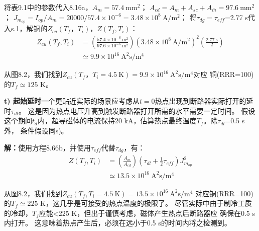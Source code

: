 将表9.1中的参数代入8.16a，$A_m=57.4\ \mathrm{mm^2}$；
$A_{cd}=A_m+A_{sc}+A_{\bar{m}}=97.6\ \mathrm{ mm^2}$；
$J_{m_{op}}=I_{op}/A_m=20000/57.4\times 10^{-6}=3.48\times 10^8\ \mathrm{ A/m^2}$；
将$\tau_{dg}=\tau_{eff}$=2.77 s代入s.1，解铜的$Z_{cu}(T_f，T_i)$，$Z(T_f,T_i)$：
\begin{align*}%
Z_{cu}(T_f,T_i)&=(\frac{57.4\times 10^{-6}\ \mathrm{m^2}}{97.6\times 10^{-6}\ \mathrm{m^2}})(3.48\times 10^8\ \mathrm{A/m^2})^2(\frac{2.77\ \mathrm{s}}{2})\\
&\simeq 9.9\times 10^{16}\ \mathrm{A^2s/m^4}
\end{align*}

从图8.2，我们找到$Z_{cu}(T_f，T_i=4.5\ \mathrm{K})=9.9\times 10^{16}\ \mathrm{A^2 s/m^4}$对应
铜(RRR=100)的$T_f\simeq 125$ K。

\textbf{t) 起始延时}\qquad 一个更贴近实际的场景应考虑从$t=0$热点出现到断路器实际打开的延时$\tau_{dl}$。
这是因为热点电压升高到触发断路器打开所需的水平需要一定时间。
假设这个期间$t_d$内，超导磁体的电流保持20 kA，估算热点最终温度$T_f$。除$\tau_{dl}$=0.5 s外，
条件假设同s)。

\textbf{解：}使用方程8.66b，并使用$\tau_{eff}$代替$\tau_{dg}$，有：
\begin{align*}%
Z(T_f,T_i)&=(\frac{A_m}{A_{cd}})(\tau_{dl}+\frac{1}{2}\tau_{eff})J_{m_{op}}^2\\
&\simeq 13.5\times 10^{16}\ \mathrm{A^2s/m^4}
\end{align*}

从图8.2，我们找到$Z_{cu}(T_f,T_i=4.5\ \mathrm{K})=13.5\times 10^{16}\ \mathrm{A^2 s/m^4}$
对应铜(RRR=100)的$T_f\simeq 225$ K，这几乎是可接受的热点温度的极限了。
尽管实际中由于制冷工质的冷却，$T_f$应能<225 K，但出于谨慎考虑，磁体产生热点后断路器应
确保在0.5 s内打开。
这意味着热点产生后，必须在远小于0.5 s的时间内将之检测到。

